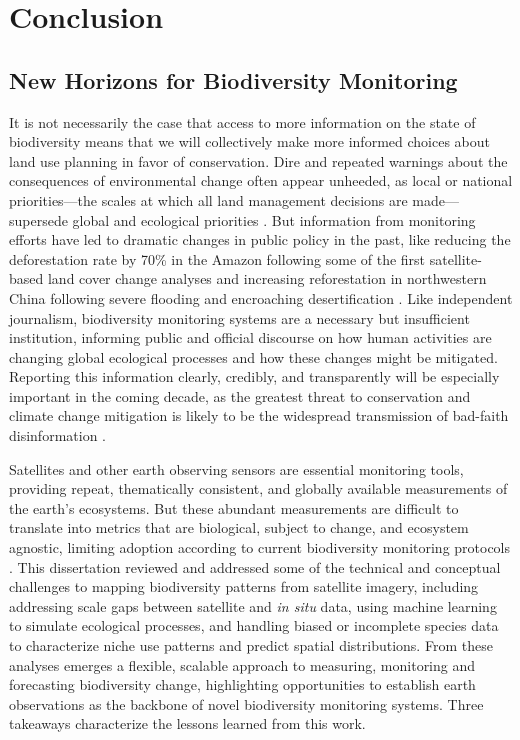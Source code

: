 \chapter{Conclusion}

\section{New Horizons for Biodiversity Monitoring}

It is not necessarily the case that access to more information on the state of biodiversity means that we will collectively make more informed choices about land use planning in favor of conservation. Dire and repeated warnings about the consequences of environmental change often appear unheeded, as local or national priorities—the scales at which all land management decisions are made—supersede global and ecological priorities \cite{Ehrlich1983-xx, Daily1999-mv, Barnosky2012-wi, IPBES2019-hl}. But information from monitoring efforts have led to dramatic changes in public policy in the past, like reducing the deforestation rate by 70\% in the Amazon following some of the first satellite-based land cover change analyses \cite{Roughgarden1991-so, Skole1993-jt, Nepstad2014-ar} and increasing reforestation in northwestern China following severe flooding and encroaching desertification \cite{Michael_A_Fullen1994-ip, Ye2005-vm}. Like independent journalism, biodiversity monitoring systems are a necessary but insufficient institution, informing public and official discourse on how human activities are changing global ecological processes and how these changes might be mitigated. Reporting this information clearly, credibly, and transparently will be especially important in the coming decade, as the greatest threat to conservation and climate change mitigation is likely to be the widespread transmission of bad-faith disinformation \cite{Iyengar2018-ij}.

Satellites and other earth observing sensors are essential monitoring tools, providing repeat, thematically consistent, and globally available measurements of the earth's ecosystems. But these abundant measurements are difficult to translate into metrics that are biological, subject to change, and ecosystem agnostic, limiting adoption according to current biodiversity monitoring protocols \cite{Geo_bon2017-ak}. This dissertation reviewed and addressed some of the technical and conceptual challenges to mapping biodiversity patterns from satellite imagery, including addressing scale gaps between satellite and \textit{in situ} data, using machine learning to simulate ecological processes, and handling biased or incomplete species data to characterize niche use patterns and predict spatial distributions. From these analyses emerges a flexible, scalable approach to measuring, monitoring and forecasting biodiversity change, highlighting opportunities to establish earth observations as the backbone of novel biodiversity monitoring systems. Three takeaways characterize the lessons learned from this work.

